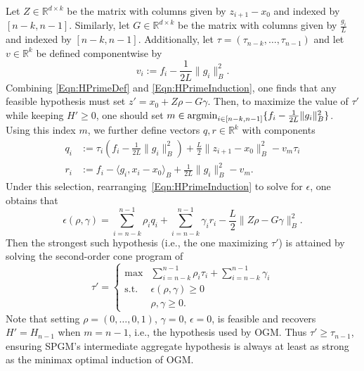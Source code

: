 \documentclass[11pt]{article}
\numberwithin{equation}{section}
\newcommand{\argmin}{\operatornamewithlimits{argmin}}
\newcommand{\R}{\mathbb{R}}
\newcommand{\Ucoef}{\rho}
\newcommand{\Wcoef}{\gamma}
\newcommand{\idxArgmin}{m}
\newcommand{\idxMem}{k}
\newcommand{\dotB}[2]{\langle {#1}, {#2} \rangle_B}
\newcommand{\normB}[1]{\|{#1}\|_B}
\newcommand{\ip}[2]{\sum_{i={n-\idxMem}}^{n-1} {#1}_i {#2}_i}
\newcommand{\fullSum}[1]{\sum_{i={n-\idxMem}}^{n-1} {#1}_i}
\theoremstyle{definition}
\theoremstyle{plain}
\theoremstyle{definition}
\begin{document}
Let $Z \in \R^{d \times \idxMem}$ be the matrix with columns given by $z_{i+1}-x_0$ and indexed by $[n-\idxMem,n-1]$. Similarly, let $G \in \R^{d \times \idxMem}$ be the matrix with columns given by $\frac{g_i}{L}$ and indexed by $[n-\idxMem,n-1]$. Additionally, let $\tau = (\tau_{n-\idxMem}, \dots, \tau_{n-1})$ and let $v \in \R^\idxMem$ be defined componentwise by
\begin{equation*}
    v_i := f_i - \frac{1}{2L}\normB{g_i}^2.
\end{equation*}
Combining \eqref{Eqn:HPrimeDef} and \eqref{Eqn:HPrimeInduction}, one finds that any feasible hypothesis must set $z' = x_0 + Z\Ucoef - G\Wcoef$. Then, to maximize the value of $\tau'$ while keeping $H' \geq 0$, one should set
$ m \in\argmin_{i \in [n-\idxMem, n-1]} \{f_i - \frac{1}{2L}\normB{g_i}^2\}$. Using this index $\idxArgmin$, we further define vectors $q,r \in \R^\idxMem$ with components
\begin{align*}
    q_i & := \tau_i(f_i - \frac{1}{2L}\normB{g_i}^2) + \frac{L}{2}\normB{z_{i+1} - x_0}^2 - v_m \tau_i \\
    r_i & := f_i - \dotB{g_i}{x_i - x_0} + \frac{1}{2L}\normB{g_i}^2 - v_m.
\end{align*}
Under this selection, rearranging~\eqref{Eqn:HPrimeInduction} to solve for $\epsilon$, one obtains that 
\begin{equation*}
    \epsilon(\Ucoef,\Wcoef) = \ip{\Ucoef}{q} + \ip{\Wcoef}{r} - \frac{L}{2} \normB{Z \Ucoef - G \Wcoef}^2.
\end{equation*}
Then the strongest such hypothesis (i.e., the one maximizing $\tau'$) is attained by solving the second-order cone program of
\begin{equation} \label{Eqn:SOCP_OGM}
    \tau' = \begin{cases}
        \max & \ip{\Ucoef}{\tau} + \fullSum{\Wcoef} \\
        \mathrm{s.t.} & \epsilon(\Ucoef, \Wcoef) \geq 0\\
        & \Ucoef, \Wcoef \geq 0.
        \end{cases}
\end{equation}
Note that setting $\Ucoef=(0,\dots,0,1)$, $\Wcoef=0$, $\epsilon=0$, is feasible and recovers $H'=H_{n-1}$ when $m=n-1$, i.e., the hypothesis used by OGM. Thus $\tau' \geq \tau_{n-1}$, ensuring SPGM's intermediate aggregate hypothesis is always at least as strong as the minimax optimal induction of OGM.
\end{document}
